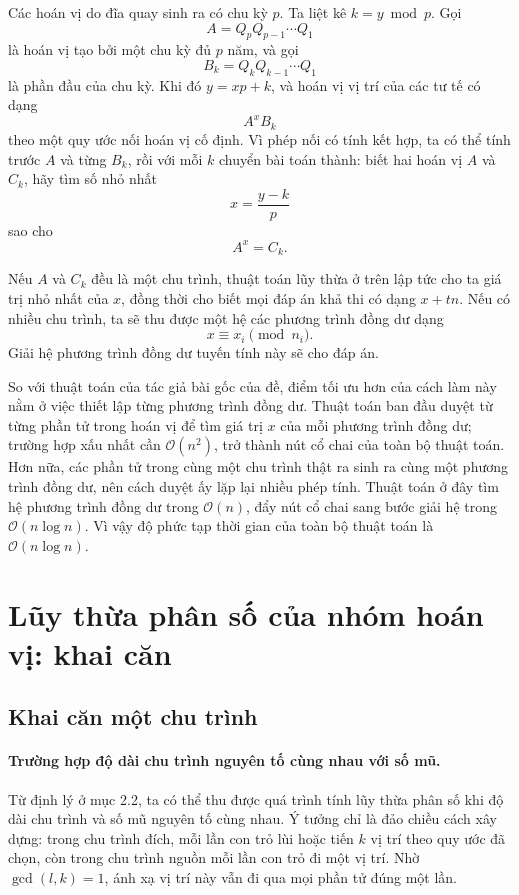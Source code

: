 \documentclass[11pt]{article}
\newcommand{\Oh}{\mathcal{O}}
\begin{document}
Các hoán vị do đĩa quay sinh ra có chu kỳ \(p\). Ta liệt kê \(k=y\bmod p\).
Gọi
\[
  A=Q_pQ_{p-1}\cdots Q_1
\]
là hoán vị tạo bởi một chu kỳ đủ \(p\) năm, và gọi
\[
  B_k=Q_kQ_{k-1}\cdots Q_1
\]
là phần đầu của chu kỳ. Khi đó \(y=xp+k\), và hoán vị vị trí của các tư tế có
dạng
\[
  A^xB_k
\]
theo một quy ước nối hoán vị cố định. Vì phép nối có tính kết hợp, ta có thể
tính trước \(A\) và từng \(B_k\), rồi với mỗi \(k\) chuyển bài toán thành:
biết hai hoán vị \(A\) và \(C_k\), hãy tìm số nhỏ nhất
\[
  x=\frac{y-k}{p}
\]
sao cho
\[
  A^x=C_k.
\]

Nếu \(A\) và \(C_k\) đều là một chu trình, thuật toán lũy thừa ở trên lập tức
cho ta giá trị nhỏ nhất của \(x\), đồng thời cho biết mọi đáp án khả thi có
dạng \(x+t n\). Nếu có nhiều chu trình, ta sẽ thu được một hệ các phương trình
đồng dư dạng
\[
  x\equiv x_i \pmod {n_i}.
\]
Giải hệ phương trình đồng dư tuyến tính này sẽ cho đáp án.

So với thuật toán của tác giả bài gốc của đề, điểm tối ưu hơn của cách làm này
nằm ở việc thiết lập từng phương trình đồng dư. Thuật toán ban đầu duyệt từ
từng phần tử trong hoán vị để tìm giá trị \(x\) của mỗi phương trình đồng dư;
trường hợp xấu nhất cần \(\Oh(n^2)\), trở thành nút cổ chai của toàn bộ thuật
toán. Hơn nữa, các phần tử trong cùng một chu trình thật ra sinh ra cùng một
phương trình đồng dư, nên cách duyệt ấy lặp lại nhiều phép tính. Thuật toán ở
đây tìm hệ phương trình đồng dư trong \(\Oh(n)\), đẩy nút cổ chai sang bước
giải hệ trong \(\Oh(n\log n)\). Vì vậy độ phức tạp thời gian của toàn bộ thuật
toán là \(\Oh(n\log n)\).

\section{Lũy thừa phân số của nhóm hoán vị: khai căn}

\subsection{Khai căn một chu trình}

\paragraph{Trường hợp độ dài chu trình nguyên tố cùng nhau với số mũ.}
Từ định lý ở mục 2.2, ta có thể thu được quá trình tính lũy thừa phân số khi
độ dài chu trình và số mũ nguyên tố cùng nhau. Ý tưởng chỉ là đảo chiều cách
xây dựng: trong chu trình đích, mỗi lần con trỏ lùi hoặc tiến \(k\) vị trí
theo quy ước đã chọn, còn trong chu trình nguồn mỗi lần con trỏ đi một vị trí.
Nhờ \(\gcd(l,k)=1\), ánh xạ vị trí này vẫn đi qua mọi phần tử đúng một lần.
\end{document}
